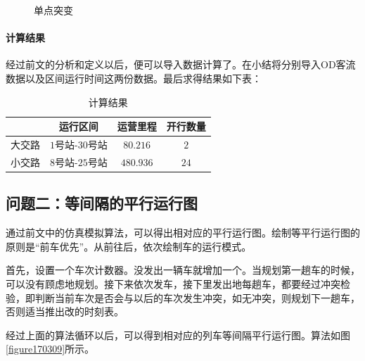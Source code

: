 \begin{enumerate}
\begin{itemize}
\begin{figure}[h]
            \caption{单点突变}
            \label{figure170202}
        \end{figure}
    \end{itemize}
\end{enumerate}


\paragraph{计算结果}

经过前文的分析和定义以后，便可以导入数据计算了。在小结将分别导入OD客流数据以及区间运行时间这两份数据。最后求得结果如下表：

\begin{table}[h]
    \centering
    \caption{计算结果}
    \begin{tabular}{cccc}
    \hline
        & 运行区间     & 运营里程   & 开行数量 \\ \hline
    大交路 & $1$号站-$30$号站 & $80.216$ & $2$    \\
    小交路 & $8$号站-$25$号站 & $480.936$ & $24$   \\ \hline
    \end{tabular}
\end{table}


\subsection{问题二：等间隔的平行运行图}

通过前文中的仿真模拟算法，可以得出相对应的平行运行图。绘制等平行运行图的原则是“前车优先”。从前往后，依次绘制车的运行模式。

首先，设置一个车次计数器。没发出一辆车就增加一个。当规划第一趟车的时候，可以没有顾虑地规划。接下来依次发车，接下里发出地每趟车，都要经过冲突检验，即判断当前车次是否会与以后的车次发生冲突，如无冲突，则规划下一趟车，否则适当推出改的时刻表。

经过上面的算法循环以后，可以得到相对应的列车等间隔平行运行图。算法如图\ref{figure170309}所示。


